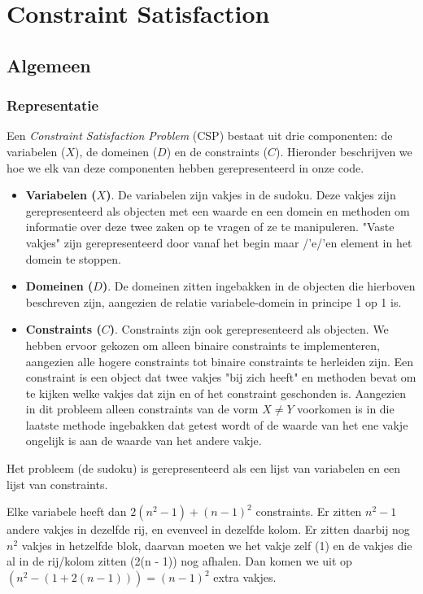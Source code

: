 \documentclass[]{report}
\begin{document}
\section{Constraint Satisfaction}
\subsection{Algemeen}
\subsubsection{Representatie}
Een \textit{Constraint Satisfaction Problem} (CSP) bestaat uit drie componenten: de variabelen ($X$), de domeinen ($D$) en de constraints ($C$). Hieronder beschrijven we hoe we elk van deze componenten hebben gerepresenteerd in onze code.
\begin{itemize}
\item \textbf{Variabelen ($X$)}. De variabelen zijn vakjes in de sudoku. Deze vakjes zijn gerepresenteerd als objecten met een waarde en een domein en methoden om informatie over deze twee zaken op te vragen of ze te manipuleren. "Vaste vakjes" zijn gerepresenteerd door vanaf het begin maar /'e/'en element in het domein te stoppen.
\item \textbf{Domeinen ($D$)}. De domeinen zitten ingebakken in de objecten die hierboven beschreven zijn, aangezien de relatie variabele-domein in principe 1 op 1 is.
\item \textbf{Constraints ($C$)}. Constraints zijn ook gerepresenteerd als objecten. We hebben ervoor gekozen om alleen binaire constraints te implementeren, aangezien alle hogere constraints tot binaire constraints te herleiden zijn. Een constraint is een object dat twee vakjes "bij zich heeft" en methoden bevat om te kijken welke vakjes dat zijn en of het constraint geschonden is. Aangezien in dit probleem alleen constraints van de vorm $ X \not= Y $ voorkomen is in die laatste methode ingebakken dat getest wordt of de waarde van het ene vakje ongelijk is aan de waarde van het andere vakje.
\end{itemize}
Het probleem (de sudoku) is gerepresenteerd als een lijst van variabelen en een lijst van constraints.

Elke variabele heeft dan $2(n^2 - 1) + (n - 1)^2$ constraints. Er zitten $n^2 - 1$ andere vakjes in dezelfde rij, en evenveel in dezelfde kolom. Er zitten daarbij nog $n^2$ vakjes in hetzelfde blok, daarvan moeten we  het vakje zelf (1) en de vakjes die al in de rij/kolom zitten (2(n - 1)) nog afhalen. Dan komen we uit op $(n^2 - (1 + 2(n - 1))) = (n - 1)^2$ extra vakjes.
\end{document}
